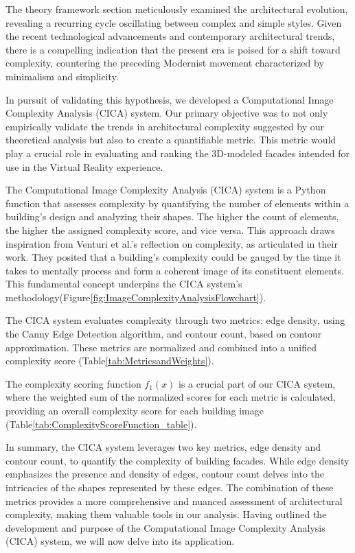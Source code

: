 The theory framework section meticulously examined the architectural evolution, revealing a recurring cycle oscillating between complex and simple styles.
Given the recent technological advancements and contemporary architectural trends, there is a compelling indication that the present era is poised for a shift toward complexity, countering the preceding Modernist movement characterized by minimalism and simplicity.

In pursuit of validating this hypothesis, we developed a Computational Image Complexity Analysis (CICA) system.
Our primary objective was to not only empirically validate the trends in architectural complexity suggested by our theoretical analysis but also to create a quantifiable metric.
This metric would play a crucial role in evaluating and ranking the 3D-modeled facades intended for use in the Virtual Reality experience.

The Computational Image Complexity  Analysis (CICA) system is a Python function that assesses complexity by quantifying the number of elements within a building's design and analyzing their shapes.
The higher the count of elements, the higher the assigned complexity score, and vice versa.
This approach draws inspiration from Venturi et al.'s reflection on complexity, as articulated in their work\cite{Venturi1977}.
They posited that a building's complexity could be gauged by the time it takes to mentally process and form a coherent image of its constituent elements.
This fundamental concept underpins the CICA system's methodology(Figure\ref{fig:ImageComplexityAnalysisFlowchart}).


The CICA system evaluates complexity through two metrics: edge density, using the Canny Edge Detection algorithm\cite{EdgeOpenCV2023}, and contour count, based on contour approximation\cite{ContourOpenCV2023}.
These metrics are normalized and combined into a unified complexity score (Table\ref{tab:MetricsandWeights}).

The complexity scoring function \(f_1(x)\) is a crucial part of our CICA system, where the weighted sum of the normalized scores for each metric is calculated, providing an overall complexity score for each building image (Table\ref{tab:ComplexityScoreFunction_table}).

In summary, the CICA system leverages two key metrics, edge density and contour count, to quantify the complexity of building facades.
While edge density emphasizes the presence and density of edges, contour count delves into the intricacies of the shapes represented by these edges.
The combination of these metrics provides a more comprehensive and nuanced assessment of architectural complexity, making them valuable tools in our analysis.
Having outlined the development and purpose of the Computational Image Complexity Analysis (CICA) system, we will now delve into its application.

